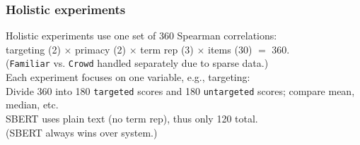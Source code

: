 \documentclass[xcolor={dvipsnames}]{beamer}
\newcommand{\param}[1]{\texttt{#1}}
\begin{document}
\begin{frame}
\frametitle{Holistic experiments}

\pause
Holistic experiments use one set of 360 Spearman correlations: \\
\vspace{.5em}
targeting (2) $\times$ primacy (2) $\times$ term rep (3) $\times$ items (30) $=$ 360. \\
\pause
\vspace{.5em}
\pause
(\param{Familiar} vs. \param{Crowd} handled separately due to sparse data.) \\

\pause
\vspace{1.4em}
Each experiment focuses on one variable, e.g., targeting: \\
\vspace{.5em}
Divide 360 into 180 \param{targeted} scores and 180 \param{untargeted} scores; compare mean, median, etc. \\

\pause
\vspace{1.4em}
SBERT uses plain text (no term rep), thus only 120 total. \\

\pause
\vspace{.5em}
(SBERT always wins over system.)
\end{frame}
\end{document}
